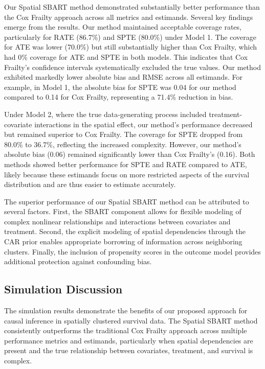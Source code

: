 \documentclass[useAMS,referee]{biom}
\begin{document}
Our Spatial SBART method demonstrated substantially better performance than the Cox Frailty approach across all metrics and estimands. Several key findings emerge from the results. Our method maintained acceptable coverage rates, particularly for RATE (86.7\%) and SPTE (80.0\%) under Model 1. The coverage for ATE was lower (70.0\%) but still substantially higher than Cox Frailty, which had 0\% coverage for ATE and SPTE in both models. This indicates that Cox Frailty's confidence intervals systematically excluded the true values. Our method exhibited markedly lower absolute bias and RMSE across all estimands. For example, in Model 1, the absolute bias for SPTE was 0.04 for our method compared to 0.14 for Cox Frailty, representing a 71.4\% reduction in bias.

Under Model 2, where the true data-generating process included treatment-covariate interactions in the spatial effect, our method's performance decreased but remained superior to Cox Frailty. The coverage for SPTE dropped from 80.0\% to 36.7\%, reflecting the increased complexity. However, our method's absolute bias (0.06) remained significantly lower than Cox Frailty's (0.16). Both methods showed better performance for SPTE and RATE compared to ATE, likely because these estimands focus on more restricted aspects of the survival distribution and are thus easier to estimate accurately.

The superior performance of our Spatial SBART method can be attributed to several factors. First, the SBART component allows for flexible modeling of complex nonlinear relationships and interactions between covariates and treatment. Second, the explicit modeling of spatial dependencies through the CAR prior enables appropriate borrowing of information across neighboring clusters. Finally, the inclusion of propensity scores in the outcome model provides additional protection against confounding bias.

\subsection{Simulation Discussion}

The simulation results demonstrate the benefits of our proposed approach for causal inference in spatially clustered survival data. The Spatial SBART method consistently outperforms the traditional Cox Frailty approach across multiple performance metrics and estimands, particularly when spatial dependencies are present and the true relationship between covariates, treatment, and survival is complex.
\end{document}
